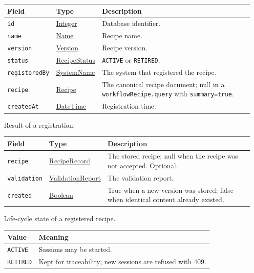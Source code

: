 \documentclass[a4paper]{arrowhead}
\newcommand{\mref}[1]{{\textcolor{ArrowheadPurple}{\hyperref[sec:model:#1]{#1}}}}
\newcommand{\pref}[1]{{\textcolor{ArrowheadGrey}{\hyperref[sec:model:primitives:#1]{#1}}}}
\begin{document}
{\small
\begin{longtable}{|p{3.9cm}|p{4.4cm}|p{7.5cm}|}

\hline
\rowcolor{gray!33} Field & Type & Description \\ \hline
\endhead
\texttt{id} & \pref{Integer} & Database identifier. \\ \hline
\texttt{name} & \pref{Name} & Recipe name. \\ \hline
\texttt{version} & \pref{Version} & Recipe version. \\ \hline
\texttt{status} & \mref{RecipeStatus} & \texttt{ACTIVE} or \texttt{RETIRED}. \\ \hline
\texttt{registeredBy} & \pref{SystemName} & The system that registered the recipe. \\ \hline
\texttt{recipe} & \mref{Recipe} & The canonical recipe document; null in a \texttt{workflow\allowbreak{}Recipe.\allowbreak{}query} with \texttt{summary=true}. \\ \hline
\texttt{createdAt} & \pref{DateTime} & Registration time. \\ \hline
\end{longtable}
}

Result of a registration.

{\small
\begin{longtable}{|p{3.9cm}|p{4.4cm}|p{7.5cm}|}

\hline
\rowcolor{gray!33} Field & Type & Description \\ \hline
\endhead
\texttt{recipe} & \mref{RecipeRecord} & The stored recipe; null when the recipe was not accepted. Optional. \\ \hline
\texttt{validation} & \mref{ValidationReport} & The validation report. \\ \hline
\texttt{created} & \pref{Boolean} & True when a new version was stored; false when identical content already existed. \\ \hline
\end{longtable}
}

Life-cycle state of a registered recipe.

{\small
\begin{longtable}{|p{3.9cm}|p{11.9cm}|}

\hline
\rowcolor{gray!33} Value & Meaning \\ \hline
\endhead
\texttt{ACTIVE} & Sessions may be started. \\ \hline
\texttt{RETIRED} & Kept for traceability; new sessions are refused with 409. \\ \hline
\end{longtable}
}
\end{document}
